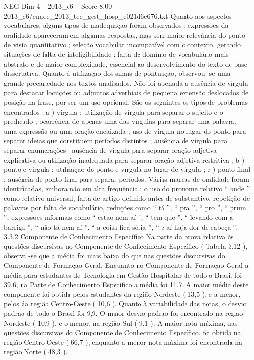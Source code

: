 \begin{textsample}{NEG Dim 4 – 2013\_c6 – Score 8.00 – 2013\_c6/enade\_2013\_tec\_gest\_hosp\_e021d6e676.txt}
Quanto aos aspectos vocabulares, alguns tipos de inadequação foram observados : expressões da oralidade apareceram em algumas respostas, mas sem maior relevância do ponto de vista quantitativo ; seleção vocabular incompatível com o contexto, gerando situações de falta de inteligibilidade ; falta de domínio de vocabulário mais abstrato e de maior complexidade, essencial ao desenvolvimento do texto de base dissertativa.
Quanto à utilização dos sinais de pontuação, observou -se uma grande precariedade nos textos analisados.
Não foi apenada a ausência de vírgula para destacar locuções ou adjuntos adverbiais de pequena extensão deslocados de posição na frase, por ser um uso opcional.
São os seguintes os tipos de problemas encontrados : a ) vírgula : utilização de vírgula para separar o sujeito e o predicado ; ocorrência de apenas uma das vírgulas para separar uma palavra, uma expressão ou uma oração encaixada ; uso de vírgula no lugar do ponto para separar ideias que constituem períodos distintos ; ausência de vírgula para separar enumerações ; ausência de vírgula para separar oração adjetiva explicativa ou utilização inadequada para separar oração adjetiva restritiva ; b ) ponto e vírgula : utilização do ponto e vírgula no lugar de vírgula ; c ) ponto final : ausência de ponto final para separar períodos.
Várias marcas de oralidade foram identificadas, embora não em alta frequência : o uso do pronome relativo “ onde ” como relativo universal, falta de artigo definido antes de substantivo, repetição de palavras por falta de vocabulário, reduções como “ tá ”, “ pra ”, “ pro ”, “ prum ”, expressões informais como “ estão nem aí ”, “ tem que ”, “ levando com a barriga ”, “ não tá nem aí ”, “ a coisa fica séria ”, “ e aí haja dor de cabeça ”. 3.3.2 Componente de Conhecimento Específico Na parte da prova relativa às questões discursivas no Componente de Conhecimento Específico ( Tabela 3.12 ), observa -se que a média foi mais baixa do que nas questões discursivas do Componente de Formação Geral.
Enquanto no Componente de Formação Geral a média para estudantes de Tecnologia em Gestão Hospitalar de todo o Brasil foi 39,6, na Parte de Conhecimento Específico a média foi 11,7.
A maior média deste componente foi obtida pelos estudantes da região Nordeste ( 13,5 ), e a menor, pelos da região Centro-Oeste ( 10,6 ).
Quanto à variabilidade das notas, o desvio padrão de todo o Brasil foi 9,9.
O maior desvio padrão foi encontrado na região Nordeste ( 10,9 ), e o menor, na região Sul ( 9,1 ).
A maior nota máxima, nas questões discursivas do Componente de Conhecimento Específico, foi obtida na região Centro-Oeste ( 66,7 ), enquanto a menor nota máxima foi encontrada na região Norte ( 48,3 ).

\end{textsample}
